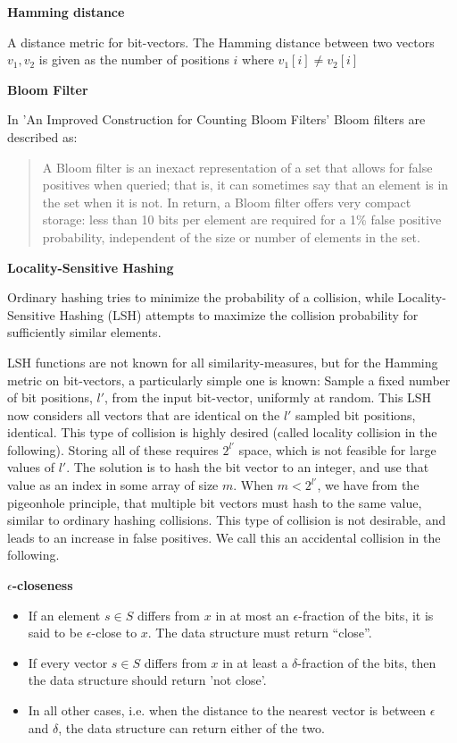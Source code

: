 \documentclass[a4paper,11pt]{article}
\begin{document}
\begin{description}
\item \textbf{Hamming distance}

A distance metric for bit-vectors. The Hamming distance between two vectors $v_1, v_2$ is given as the number of positions $i$ where $v_1[i] \neq v_2[i]$

\item \textbf{Bloom Filter}

In 'An Improved Construction for Counting Bloom Filters' \cite{paper:bloom} Bloom filters are described as:
\begin{quotation}
A Bloom filter is an inexact representation of a set that allows for false positives when queried; that is, it can sometimes say that an element is in the set when it is not. In return, a Bloom filter offers very compact storage: less than 10 bits per element are required for a 1\% false positive probability, independent of the size or number of elements in the set.
\end{quotation}


\item \textbf{Locality-Sensitive Hashing}
\label{sec:lsh}

Ordinary hashing tries to minimize the probability of a collision, while Locality-Sensitive Hashing (LSH) attempts to maximize the collision probability for sufficiently similar elements.

LSH functions are not known for all similarity-measures, but for the Hamming metric on bit-vectors, a particularly simple one is known: Sample a fixed number of bit positions, $l'$, from the input bit-vector, uniformly at random.
This LSH now considers all vectors that are identical on the $l'$ sampled bit positions, identical. This type of collision is highly desired (called locality collision in the following). Storing all of these requires $2^{l'}$ space, which is not feasible for large values of $l'$. The solution is to hash the bit vector to an integer, and use that value as an index in some array of size $m$. When $m < 2^{l'}$, we have from the pigeonhole principle, that multiple bit vectors must hash to the same value, similar to ordinary hashing collisions. This type of collision is not desirable, and leads to an increase in false positives. We call this an accidental collision in the following.

\item \textbf{$\epsilon$-closeness}
  \begin{itemize}
    \item If an element $s \in S$ differs from $x$ in at most an $\epsilon$-fraction of the bits, it is said to be $\epsilon$-close to $x$. The data structure must return “close”.
    \item If every vector $s \in S$ differs from $x$ in at least a $\delta$-fraction of the bits, then the data structure should return 'not close'.
    \item In all other cases, i.e. when the distance to the nearest vector is between $\epsilon$ and $\delta$, the data structure can return either of the two.
  \end{itemize}

\end{description}
\end{document}
